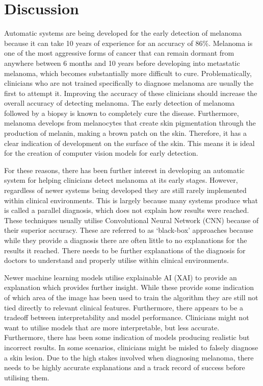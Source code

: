 \section{Discussion}
Automatic systems are being developed for the early detection of melanoma because it can take 10 years of experience for an accuracy of 86\%\cite{Morton1998}. Melanoma is one of the most aggressive forms of cancer that can remain dormant from anywhere between 6 months and 10 years before developing into metastatic melanoma, which becomes substantially more difficult to cure\cite{UK2019}. Problematically, clinicians who are not trained specifically to diagnose melanoma are usually the first to attempt it. Improving the accuracy of these clinicians should increase the overall accuracy of detecting melanoma. The early detection of melanoma followed by a biopsy is known to completely cure the disease\cite{}. Furthermore, melanoma develops from melanocytes that create skin pigmentation through the production of melanin, making a brown patch on the skin. Therefore, it has a clear indication of development on the surface of the skin. This means it is ideal for the creation of computer vision models for early detection.

For these reasons, there has been further interest in developing an automatic system for helping clinicians detect melanoma at its early stages. However, regardless of newer systems being developed they are still rarely implemented within clinical environments. This is largely because many systems produce what is called a parallel diagnosis, which does not explain how results were reached\cite{Lipton2018}. These techniques usually utilise Convolutional Neural Network (CNN) because of their superior accuracy\cite{Wen2022}. These are referred to as `black-box' approaches because while they provide a diagnosis there are often little to no explanations for the results it reached\cite{Andre2017}. There needs to be further explanations of the diagnosis for doctors to understand and properly utilise within clinical environments. 

Newer machine learning models utilise explainable AI (XAI) to provide an explanation which provides further insight\cite{skar2017}. While these provide some indication of which area of the image has been used to train the algorithm they are still not tied directly to relevant clinical features. Furthermore, there appears to be a tradeoff between interpretability and model performance. Clinicians might not want to utilise models that are more interpretable, but less accurate. Furthermore, there has been some indication of models producing realistic but incorrect results\cite{Lipton2018}. In some scenarios, clinicians might be misled to falsely diagnose a skin lesion. Due to the high stakes involved when diagnosing melanoma, there needs to be highly accurate explanations and a track record of success before utilising them.

